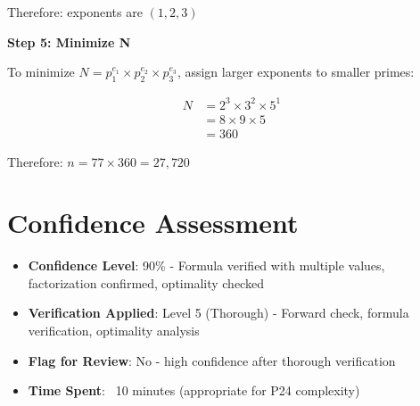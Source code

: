 \documentclass[11pt]{article}
\begin{document}
Therefore: exponents are $(1, 2, 3)$

\textbf{Step 5: Minimize N}

To minimize $N = p_1^{e_1} \times p_2^{e_2} \times p_3^{e_3}$, assign larger exponents to smaller primes:

\begin{align*}
N &= 2^3 \times 3^2 \times 5^1 \\
&= 8 \times 9 \times 5 \\
&= 360
\end{align*}

Therefore: $n = 77 \times 360 = 27,720$

\section*{Confidence Assessment}
\begin{itemize}[leftmargin=*]
    \item \textbf{Confidence Level}: 90\% - Formula verified with multiple values, factorization confirmed, optimality checked
    \item \textbf{Verification Applied}: Level 5 (Thorough) - Forward check, formula verification, optimality analysis
    \item \textbf{Flag for Review}: No - high confidence after thorough verification
    \item \textbf{Time Spent}: ~10 minutes (appropriate for P24 complexity)
\end{itemize}
\end{document}
